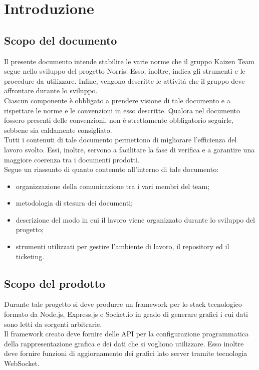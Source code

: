 \section{Introduzione}
	\subsection{Scopo del documento}
		Il presente documento intende stabilire le varie norme che il gruppo Kaizen Team segue nello sviluppo del progetto Norris. Esso, inoltre, indica gli strumenti e le procedure da utilizzare. Infine, vengono descritte le attività che il gruppo deve affrontare durante lo sviluppo.\\
		Ciascun componente è obbligato a prendere visione di tale documento e a rispettare le norme e le convenzioni in esso descritte. Qualora nel documento fossero presenti delle convenzioni, non è strettamente obbligatorio seguirle, sebbene sia caldamente consigliato.\\
		Tutti i contenuti di tale documento permettono di migliorare l’efficienza del lavoro svolto. Essi, inoltre, servono a facilitare la fase di verifica e a garantire una maggiore coerenza tra i documenti prodotti.\\
		Segue un riassunto di quanto contenuto all'interno di tale documento:
		\begin{itemize}
			\item organizzazione della comunicazione tra i vari membri del team;
			\item metodologia di stesura dei documenti;
			\item descrizione del modo in cui il lavoro viene organizzato durante lo sviluppo del progetto;
			\item strumenti utilizzati per gestire l'ambiente di lavoro, il repository ed il ticketing.
		\end{itemize}
	\subsection{Scopo del prodotto}
		Durante tale progetto si deve produrre un framework per lo stack tecnologico formato da Node.js, Express.js e Socket.io in grado di generare grafici i cui dati sono letti da sorgenti arbitrarie.\\
		Il framework creato deve fornire delle API per la configurazione programmatica della rappresentazione grafica e dei dati che si vogliono utilizzare. Esso inoltre deve fornire funzioni di aggiornamento dei grafici lato server tramite tecnologia WebSocket.
